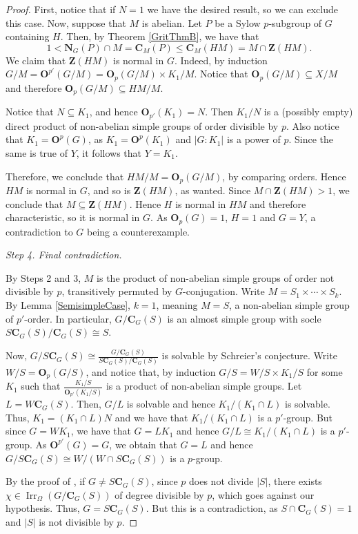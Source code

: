 \documentclass[12pt]{amsart}
\theoremstyle{theorem}
\theoremstyle{definition}
\newcommand{\bC} {\mathbf C}
\newcommand{\bO}{{\mathbf O}}
\newcommand{\bN} {\mathbf N}
\newcommand{\bZ} {\mathbf Z}
\newcommand{\Irr}{{\operatorname{Irr}}}
\begin{document}
\begin{proof}
		First, notice that if $N=1$ we have the desired result, so we can exclude this case. Now, suppose that $M$ is abelian. Let $P$ be a Sylow $p$-subgroup of $G$ containing $H$. Then, by Theorem \ref{GritThmB}, we have that 
		\begin{equation*}
			1<\bN_G(P)\cap M=\bC_M(P)\leq \bC_M(HM)=M\cap \bZ(HM). 
		\end{equation*}
		We claim that $\bZ(HM)$ is normal in $G$. Indeed, by induction $G/M=\bO^{p'}(G/M)=\bO_p(G/M)\times K_1/M$. Notice that $\bO_p(G/M)\subseteq X/M$ and therefore $\bO_p(G/M)\subseteq HM/M$. 
	
		Notice that $N \subseteq K_1$, and hence $\bO_{p'}(K_1) = N$. Then $K_1/N$ is a (possibly empty) direct product of non-abelian simple groups of order divisible by $p$. Also notice that $K_1 = \bO^p(G)$, as $K_1 = \bO^p(K_1)$ and $|G:K_1|$ is a power of $p$. Since the same is true of $Y$, it follows that $Y = K_1$.
	
		Therefore, we conclude that $HM/M=\bO_p(G/M)$, by comparing orders. Hence $HM$ is normal in $G$, and so is $\bZ(HM)$, as wanted. Since $M\cap \bZ(HM)>1$, we conclude that $M\subseteq\bZ(HM)$. Hence $H$ is normal in $HM$ and therefore characteristic, so it is normal in $G$. As $\bO_p(G) = 1$, $H = 1$ and $G = Y$, a contradiction to $G$ being a counterexample.
		\bigskip
	
		\textit{Step 4. Final contradiction.}
		\medskip
	
		By Steps 2 and 3, $M$ is the product of non-abelian simple groups of order not divisible by $p$, transitively permuted by $G$-conjugation. Write $M = S_1 \times \cdots \times S_k$. By Lemma \ref{SemisimpleCase}, $k = 1$, meaning $M = S$, a non-abelian simple group of $p'$-order. In particular, $G/\bC_G(S)$ is an almost simple group with socle $S\bC_G(S)/\bC_G(S)\cong S$. 
	
		Now, $G/S\bC_G(S)\cong \frac{G/\bC_G(S)}{S\bC_G(S)/\bC_G(S)}$ is solvable by Schreier's conjecture. Write $W/S=\bO_p(G/S)$, and notice that, by induction $G/S=W/S\times K_1/S$ for some $K_1$ such that $\frac{K_1/S}{\bO_{p'}(K_1/S)}$ is a product of non-abelian simple groups. Let $L=W\bC_G(S)$. Then, $G/L$ is solvable and hence $K_1/(K_1\cap L)$ is solvable. Thus, $K_1=(K_1\cap L)N$ and we have that $K_1/(K_1\cap L)$ is a $p'$-group. But since $G=WK_1$, we have that $G=LK_1$ and hence $G/L\cong K_1/(K_1\cap L)$ is a $p'$-group. As $\bO^{p'}(G)=G$, we obtain that $G=L$ and hence $G/S\bC_G(S)\cong W/(W\cap S\bC_G(S))$ is a $p$-group.
	
		By the proof of \cite[Theorem 2.8]{MMRSF}, if $G \neq S\bC_G(S)$, since $p$ does not divide $|S|$, there exists $\chi \in \Irr_{\Omega}(G/\bC_G(S))$ of degree divisible by $p$, which goes against our hypothesis. Thus, $G = S\bC_G(S)$. But this is a contradiction, as $S \cap \bC_G(S) = 1$ and $|S|$ is not divisible by $p$.
	\end{proof}
\end{document}
